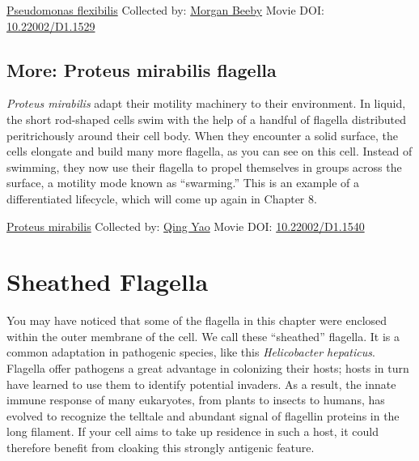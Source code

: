 \documentclass[]{tufte-book}
\begin{document}
\hypertarget{htmlwidget-9816c5577225fdf17bb9}{}

\label{fig:6-5}\protect\hyperlink{tree}{Pseudomonas flexibilis} Collected by: \protect\hyperlink{morgan_beeby}{Morgan Beeby} Movie DOI: \href{https://doi.org/10.22002/D1.1529}{10.22002/D1.1529}

\hypertarget{Proteus_mirabilis_flagella}{%
\subsection*{More: Proteus mirabilis flagella}\label{Proteus_mirabilis_flagella}}

\emph{Proteus mirabilis} adapt their motility machinery to their environment. In liquid, the short rod-shaped cells swim with the help of a handful of flagella distributed peritrichously around their cell body. When they encounter a solid surface, the cells elongate and build many more flagella, as you can see on this cell. Instead of swimming, they now use their flagella to propel themselves in groups across the surface, a motility mode known as ``swarming.'' This is an example of a differentiated lifecycle, which will come up again in Chapter 8.



\hypertarget{htmlwidget-6cf2a356329992bc3599}{}

\label{fig:6-5a}\protect\hyperlink{tree}{Proteus mirabilis} Collected by: \protect\hyperlink{qing_yao}{Qing Yao} Movie DOI: \href{https://doi.org/10.22002/D1.1540}{10.22002/D1.1540}

\hypertarget{sheathed-flagella}{%
\section{Sheathed Flagella}\label{sheathed-flagella}}

You may have noticed that some of the flagella in this chapter were enclosed within the outer membrane of the cell. We call these ``sheathed'' flagella. It is a common adaptation in pathogenic species, like this \emph{Helicobacter hepaticus}. Flagella offer pathogens a great advantage in colonizing their hosts; hosts in turn have learned to use them to identify potential invaders. As a result, the innate immune response of many eukaryotes, from plants to insects to humans, has evolved to recognize the telltale and abundant signal of flagellin proteins in the long filament. If your cell aims to take up residence in such a host, it could therefore benefit from cloaking this strongly antigenic feature.
\end{document}
